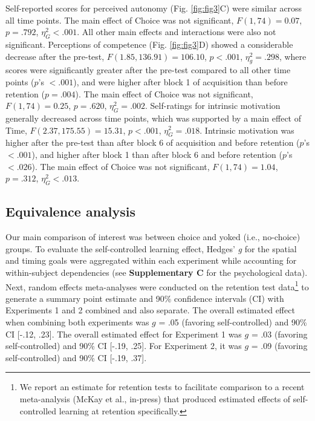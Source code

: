 \documentclass[
  doc, donotrepeattitle,floatsintext]{apa7}
\begin{document}
Self-reported scores for perceived autonomy (Fig. \ref{fig:fig3}C) were similar across all time points. The main effect of Choice was not significant, \(F(1,74) = 0.07\), \(p = .792\), \(\eta_{G}^2 < .001\). All other main effects and interactions were also not significant. Perceptions of competence (Fig. \ref{fig:fig3}D) showed a considerable decrease after the pre-test, \(F(1.85,136.91) = 106.10\), \(p < .001\), \(\eta_{g}^2 = .298\), where scores were significantly greater after the pre-test compared to all other time points (\(p\)'s \(< .001\)), and were higher after block 1 of acquisition than before retention (\(p = .004\)). The main effect of Choice was not significant, \(F(1,74) = 0.25\), \(p = .620\), \(\eta_{G}^2 = .002\). Self-ratings for intrinsic motivation generally decreased across time points, which was supported by a main effect of Time, \(F(2.37,175.55) = 15.31\), \(p < .001\), \(\eta_{G}^2 = .018\). Intrinsic motivation was higher after the pre-test than after block 6 of acquisition and before retention (\(p\)'s \(< .001\)), and higher after block 1 than after block 6 and before retention (\(p\)'s \(< .026\)). The main effect of Choice was not significant, \(F(1,74) = 1.04\), \(p = .312\), \(\eta_{G}^2 < .013\).

\hypertarget{equivalence-analysis}{%
\subsection{Equivalence analysis}\label{equivalence-analysis}}

Our main comparison of interest was between choice and yoked (i.e., no-choice) groups. To evaluate the self-controlled learning effect, Hedges' \emph{g} for the spatial and timing goals were aggregated within each experiment while accounting for within-subject dependencies (see \textbf{Supplementary C} for the psychological data). Next, random effects meta-analyses were conducted on the retention test data\footnote{We report an estimate for retention tests to facilitate comparison to a recent meta-analysis (McKay et al., in-press) that produced estimated effects of self-controlled learning at retention specifically.} to generate a summary point estimate and 90\% confidence intervals (CI) with Experiments 1 and 2 combined and also separate. The overall estimated effect when combining both experiments was \(g\) = .05 (favoring self-controlled) and 90\% CI {[}-.12, .23{]}. The overall estimated effect for Experiment 1 was \(g\) = .03 (favoring self-controlled) and 90\% CI {[}-.19, .25{]}. For Experiment 2, it was \(g\) = .09 (favoring self-controlled) and 90\% CI {[}-.19, .37{]}.
\end{document}
